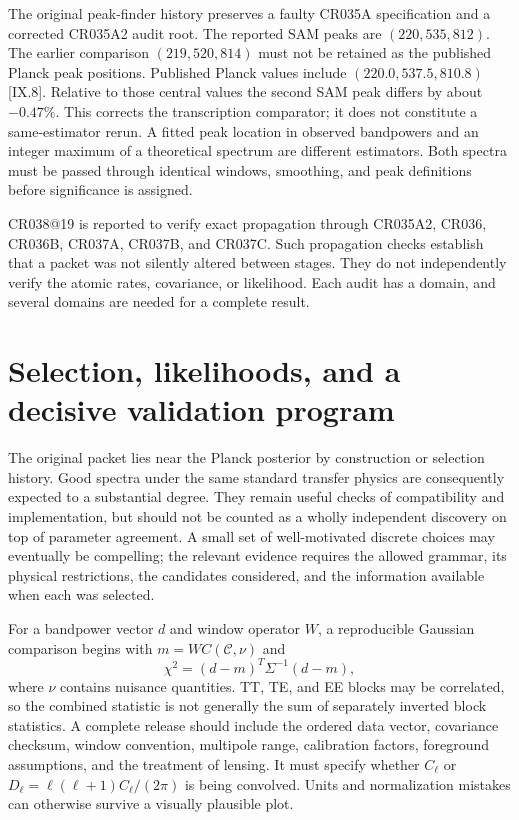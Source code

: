 The original peak-finder history preserves a faulty CR035A specification and a corrected CR035A2 audit root. The reported SAM peaks are $(220,535,812)$. The earlier comparison $(219,520,814)$ must not be retained as the published Planck peak positions. Published Planck values include $(220.0,537.5,810.8)$ [IX.8]. Relative to those central values the second SAM peak differs by about $-0.47\%$. This corrects the transcription comparator; it does not constitute a same-estimator rerun. A fitted peak location in observed bandpowers and an integer maximum of a theoretical spectrum are different estimators. Both spectra must be passed through identical windows, smoothing, and peak definitions before significance is assigned.

CR038@19 is reported to verify exact propagation through CR035A2, CR036, CR036B, CR037A, CR037B, and CR037C. Such propagation checks establish that a packet was not silently altered between stages. They do not independently verify the atomic rates, covariance, or likelihood. Each audit has a domain, and several domains are needed for a complete result.

\section{Selection, likelihoods, and a decisive validation program}

The original packet lies near the Planck posterior by construction or selection history. Good spectra under the same standard transfer physics are consequently expected to a substantial degree. They remain useful checks of compatibility and implementation, but should not be counted as a wholly independent discovery on top of parameter agreement. A small set of well-motivated discrete choices may eventually be compelling; the relevant evidence requires the allowed grammar, its physical restrictions, the candidates considered, and the information available when each was selected.

For a bandpower vector $d$ and window operator $W$, a reproducible Gaussian comparison begins with $m=W C(\mathcal C,\nu)$ and
\begin{equation}
 \chi^2=(d-m)^T\Sigma^{-1}(d-m),
 \label{c9:bandpower}
\end{equation}
where $\nu$ contains nuisance quantities. TT, TE, and EE blocks may be correlated, so the combined statistic is not generally the sum of separately inverted block statistics. A complete release should include the ordered data vector, covariance checksum, window convention, multipole range, calibration factors, foreground assumptions, and the treatment of lensing. It must specify whether $C_\ell$ or $D_\ell=\ell(\ell+1)C_\ell/(2\pi)$ is being convolved. Units and normalization mistakes can otherwise survive a visually plausible plot.


